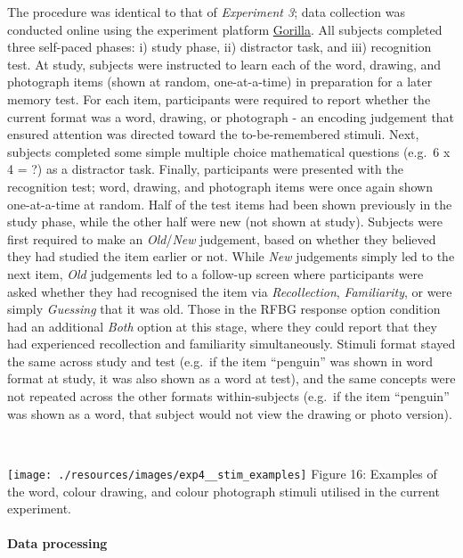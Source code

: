 \documentclass[
  11pt,
]{article}
\begin{document}
\hfill\break The procedure was identical to that of \emph{Experiment 3};
data collection was conducted online using the experiment platform
\href{https://gorilla.sc/}{Gorilla}. All subjects completed three
self-paced phases: i) study phase, ii) distractor task, and iii)
recognition test. At study, subjects were instructed to learn each of
the word, drawing, and photograph items (shown at random, one-at-a-time)
in preparation for a later memory test. For each item, participants were
required to report whether the current format was a word, drawing, or
photograph - an encoding judgement that ensured attention was directed
toward the to-be-remembered stimuli. Next, subjects completed some
simple multiple choice mathematical questions (e.g.~6 x 4 = ?) as a
distractor task. Finally, participants were presented with the
recognition test; word, drawing, and photograph items were once again
shown one-at-a-time at random. Half of the test items had been shown
previously in the study phase, while the other half were new (not shown
at study). Subjects were first required to make an \emph{Old}/\emph{New}
judgement, based on whether they believed they had studied the item
earlier or not. While \emph{New} judgements simply led to the next item,
\emph{Old} judgements led to a follow-up screen where participants were
asked whether they had recognised the item via \emph{Recollection},
\emph{Familiarity}, or were simply \emph{Guessing} that it was old.
Those in the RFBG response option condition had an additional
\emph{Both} option at this stage, where they could report that they had
experienced recollection and familiarity simultaneously. Stimuli format
stayed the same across study and test (e.g.~if the item ``penguin'' was
shown in word format at study, it was also shown as a word at test), and
the same concepts were not repeated across the other formats
within-subjects (e.g.~if the item ``penguin'' was shown as a word, that
subject would not view the drawing or photo version).

~ ~

\texttt{[image: ./resources/images/exp4\_\_stim\_examples]}
Figure 16: Examples of the word, colour drawing, and colour photograph
stimuli utilised in the current experiment. ~ ~

\hypertarget{data-processing-3}{%
\paragraph{Data processing}\label{data-processing-3}}
\end{document}
